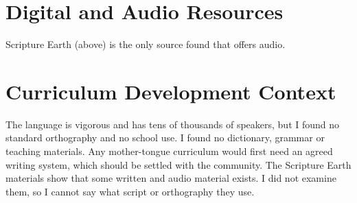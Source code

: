 \documentclass[12pt]{article}
\begin{document}
\section{Digital and Audio Resources}
Scripture Earth (above) is the only source found that offers audio.
\section{Curriculum Development Context}
The language is vigorous and has tens of thousands of speakers, but I found no standard orthography and no school use. I found no dictionary, grammar or teaching materials. Any mother-tongue curriculum would first need an agreed writing system, which should be settled with the community. The Scripture Earth materials show that some written and audio material exists. I did not examine them, so I cannot say what script or orthography they use.
\end{document}
